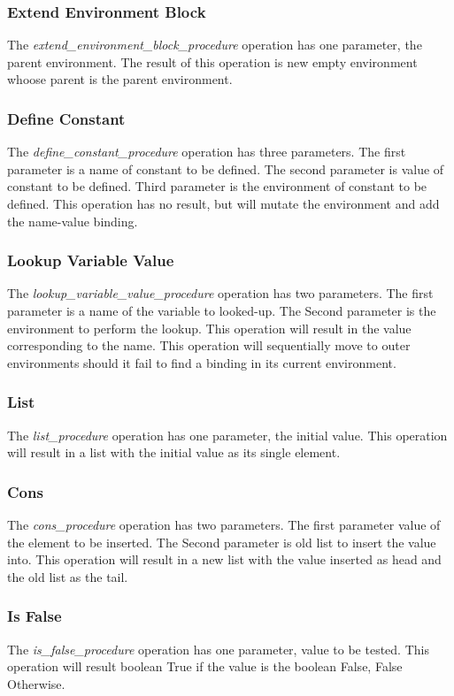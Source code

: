\subsubsection{Extend Environment Block}
The \textit{ extend\_environment\_block\_procedure} operation has one parameter, the parent environment.
The result of this operation is new empty environment whoose parent is the parent environment.

\subsubsection{Define Constant}
The \textit{ define\_constant\_procedure} operation has three parameters.
The first parameter is a name of constant to be defined. The second parameter is value of constant to be defined. Third parameter is the environment of constant to be defined.
This operation has no result, but will mutate the environment and add the name-value binding.

\subsubsection{Lookup Variable Value}
The \textit{ lookup\_variable\_value\_procedure} operation has two parameters.
The first parameter is a name of the variable to looked-up. The Second parameter is the environment to perform the lookup.
This operation will result in the value corresponding to the name. This operation will sequentially move to outer environments should it fail to find a binding in its current environment.

\subsubsection{List}
The \textit{ list\_procedure} operation has one parameter, the initial value.
This operation will result in a list with the initial value as its single element. 

\subsubsection{Cons}
The \textit{ cons\_procedure} operation has two parameters.
The first parameter value of the element to be inserted. The Second parameter is old list to insert the value into.
This operation will result in a new list with the value inserted as head and the old list as the tail. 

\subsubsection{Is False}
The \textit{ is\_false\_procedure} operation has one parameter, value to be tested.
This operation will result boolean True if the value is the boolean False, False Otherwise. 

